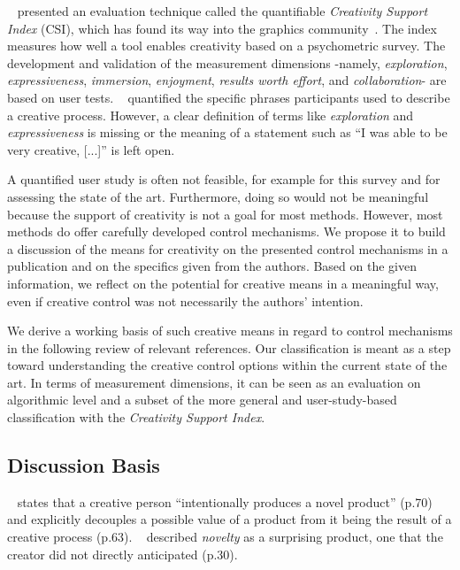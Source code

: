 \citeauthor*{cherry_2014_qcs}~\cite{cherry_2014_qcs} presented an evaluation technique called the quantifiable \textit{Creativity Support Index} (CSI), which has found its way into the graphics community~\cite{shugrina_2017_ppi}. The index measures how well a tool enables creativity based on a psychometric survey. The development and validation of the measurement dimensions -namely, \textit{exploration}, \textit{expressiveness}, \textit{immersion}, \textit{enjoyment}, \textit{results worth effort}, and \textit{collaboration}- are based on user tests. \citeauthor*{cherry_2014_qcs}~\cite{cherry_2014_qcs} quantified the specific phrases participants used to describe a creative process. However, a clear definition of terms like \textit{exploration} and \textit{expressiveness} is missing or the meaning of a statement such as ``I was able to be very creative, [...]'' is left open. 

A quantified user study is often not feasible, for example for this survey and for assessing the state of the art. Furthermore, doing so would not be meaningful because the support of creativity is not a goal for most methods. However, most methods do offer carefully developed control mechanisms. We propose it to build a discussion of the means for creativity on the presented control mechanisms in a publication and on the specifics given from the authors. Based on the given information, we reflect on the potential for creative means in a meaningful way, even if creative control was not necessarily the authors' intention. 

We derive a working basis of such creative means in regard to control mechanisms in the following review of relevant references. Our classification is meant as a step toward understanding the creative control options within the current state of the art. In terms of measurement dimensions, it can be seen as an evaluation on algorithmic level and a subset of the more general and user-study-based classification with the \textit{Creativity Support Index}. 

\subsection{Discussion Basis}\label{subsec:creative_means}

\citeauthor*{weisberg_2006_cui}~\cite{weisberg_2006_cui} states that a creative person ``intentionally produces a novel product'' (p.70) and explicitly decouples a possible value of a product from it being the result of a creative process (p.63). 
\citeauthor*{boden_2010_cat}~\cite{boden_2010_cat} described \textit{novelty} as a surprising product, one that the creator did not directly anticipated (p.30). 



